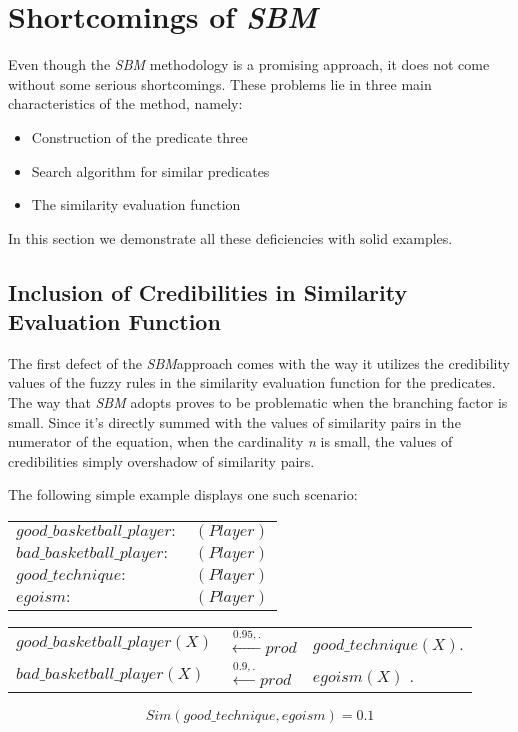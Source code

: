 \section{Shortcomings of \textit{SBM}}
\label{sec:Shortcomings}

Even though the \textit{SBM} methodology is a promising approach, it does not come without some serious shortcomings. These problems lie in three main characteristics of the method, namely:
\begin{itemize}
\item Construction of the predicate three
\item Search algorithm for similar predicates
\item The similarity evaluation function
\end{itemize}
In this section we demonstrate all these deficiencies with solid examples.

\subsection{Inclusion of Credibilities in Similarity Evaluation Function}
\label{cred}

The first defect of the \textit{SBM}approach comes with the way it utilizes the credibility values of the fuzzy rules in the similarity evaluation function for the predicates. The way that \textit{SBM} adopts proves to be problematic when the branching factor is small.  Since it's directly summed with the values of similarity pairs in the numerator of the equation, when the cardinality \textit{n} is small, the values of credibilities simply overshadow of similarity pairs.

\begin{ex}
The following simple example displays one such scenario:

\begin{center}
\begin{tabular}{l l}
$good\_basketball\_player:$  & $(Player)$\\

$bad\_basketball\_player:$ &  $(Player)$\\

$good\_technique:$ &  $(Player)$\\

$egoism:$ &  $(Player)$\\

\end{tabular}
\end{center}
\begin{tabular}{l l l}
$good\_basketball\_player(X)$ & $\stackrel{0.95,.}{\longleftarrow} prod$ & $good\_technique(X)$.\\

$bad\_basketball\_player(X)$ & $\stackrel{0.9,.}{\longleftarrow} prod$ & $egoism(X)$ .\\

\end{tabular}
\[Sim(good\_technique, egoism) = 0.1\]

\end{ex}


